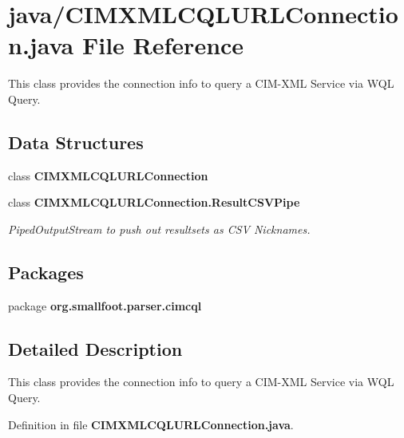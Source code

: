 \section{java/\+C\+I\+M\+X\+M\+L\+C\+Q\+L\+U\+R\+L\+Connection.java File Reference}
\label{CIMXMLCQLURLConnection_8java}


This class provides the connection info to query a C\+I\+M-\/\+X\+M\+L Service via W\+Q\+L Query.  


\subsection*{Data Structures}
\begin{DoxyCompactItemize}
\item 
class {\bf C\+I\+M\+X\+M\+L\+C\+Q\+L\+U\+R\+L\+Connection}
\item 
class {\bf C\+I\+M\+X\+M\+L\+C\+Q\+L\+U\+R\+L\+Connection.\+Result\+C\+S\+V\+Pipe}
\begin{DoxyCompactList}\small\item\em Piped\+Output\+Stream to push out resultsets as C\+S\+V Nicknames. \end{DoxyCompactList}\end{DoxyCompactItemize}
\subsection*{Packages}
\begin{DoxyCompactItemize}
\item 
package {\bf org.\+smallfoot.\+parser.\+cimcql}
\end{DoxyCompactItemize}


\subsection{Detailed Description}
This class provides the connection info to query a C\+I\+M-\/\+X\+M\+L Service via W\+Q\+L Query. 



Definition in file {\bf C\+I\+M\+X\+M\+L\+C\+Q\+L\+U\+R\+L\+Connection.\+java}.

